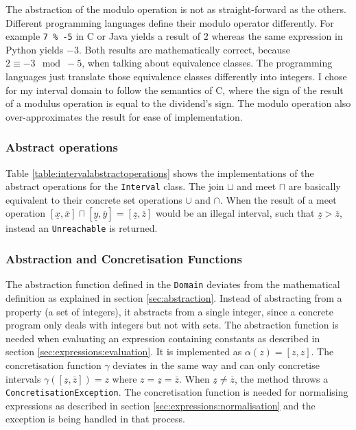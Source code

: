 The abstraction of the modulo operation is not as straight-forward as the others. Different programming languages define their modulo operator differently. For example \texttt{7 \% -5} in C or Java yields a result of $2$ whereas the same expression in Python yields $-3$. Both results are mathematically correct, because $2 \equiv -3 \mod -5$, when talking about equivalence classes. The programming languages just translate those equivalence classes differently into integers. I chose for my interval domain to follow the semantics of C, where the sign of the result of a modulus operation is equal to the dividend's sign. The modulo operation also over-approximates the result for ease of implementation.



\subsubsection{Abstract operations}
Table \ref{table:intervalabstractoperations} shows the implementations of the abstract operations for the \texttt{Interval} class. The join $\sqcup$ and meet $\sqcap$ are basically equivalent to their concrete set operations $\cup$ and $\cap$. When the result of a meet operation $[\underline{x},\overline{x}] \sqcap [\underline{y},\overline{y}] = [\underline{z},\overline{z}]$ would be an illegal interval, such that 
$\underline{z}>\overline{z}$, instead an \texttt{Unreachable} is returned.



\subsubsection{Abstraction and Concretisation Functions}
The abstraction function defined in the \texttt{Domain} deviates from the mathematical definition as explained in section \ref{sec:abstraction}. Instead of abstracting from a property (a set of integers), it abstracts from a single integer, since a concrete program only deals with integers but not with sets. The abstraction function is needed when evaluating an expression containing constants as described in section \ref{sec:expressions:evaluation}. It is implemented as $\alpha(z)=[z,z]$.
The concretisation function $\gamma$ deviates in the same way and can only concretise intervals $\gamma([\underline{z},\overline{z}])=z$ where $z = \underline{z} = \overline{z}$. When $\underline{z} \neq \overline{z}$, the method throws a \texttt{ConcretisationException}. The concretisation function is needed for normalising expressions as described in section \ref{sec:expressions:normalisation} and the exception is being handled in that process. 

